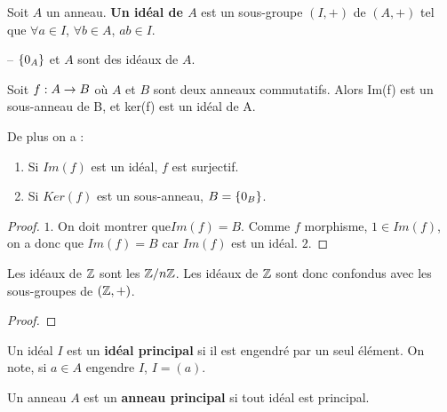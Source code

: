 \begin{definition}
	Soit $A$ un anneau. \textbf{Un idéal de $A$} est un sous-groupe $(I, +)$ de
	$(A, +)$ tel que $\forall a \in I$, $\forall b \in A$, $ab \in I$.
\end{definition}

\begin{exemple}
	-- $\left\{ 0_{A} \right\}$ et $A$ sont des idéaux de $A$.
\end{exemple}

\begin{proposition}
	Soit $f : A \rightarrow B$ où $A$ et $B$ sont deux anneaux commutatifs. Alors
	Im(f) est un sous-anneau de B, et ker(f) est un idéal de A.

	De plus on a :
	\begin{enumerate}
		\item Si $Im(f)$ est un idéal, $f$ est surjectif.
		\item Si $Ker(f)$ est un sous-anneau, $B = \left\{ 0_{B} \right\}$.
	\end{enumerate}
\end{proposition}

\ifdefined\outputproof
\begin{proof}
	$1$. On doit montrer que$ Im(f) = B$. Comme $f$ morphisme, $1 \in Im(f)$, on a
	donc que $Im(f) = B$ car $Im(f)$ est un idéal.
	$2$.
\end{proof}
\fi

\begin{proposition}
	Les idéaux de $\mathbb{Z}$ sont les $\mathbb{Z}/n\mathbb{Z}$. Les idéaux de
	$\mathbb{Z}$ sont donc confondus avec les sous-groupes de $(\mathbb{Z}, +)$.
\end{proposition}

\ifdefined\outputproof
\begin{proof}

\end{proof}
\fi

\begin{definition} 
	\label{def:principal_ideal}
	Un idéal $I$ est un \textbf{idéal principal} si il est engendré par un seul
	élément. On note, si $a \in A$ engendre $I$, $I = (a)$.
\end{definition}

\begin{definition} 
	Un anneau $A$ est un \textbf{anneau principal} si tout idéal est principal.
	\label{principal_ring}
\end{definition}

